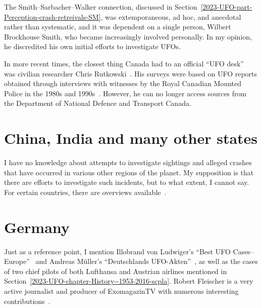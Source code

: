 The Smith--Sarbacher--Walker connection, discussed in Section~\ref{2023-UFO-part-Perception-crash-retreivals-SM}, was extemporaneous, ad hoc, and anecdotal rather than systematic, and it was dependent on a single person, Wilbert Brockhouse Smith, who became increasingly involved personally. In my opinion, he discredited his own initial efforts to investigate UFOs.

In more recent times, the closest thing Canada had to an official ``UFO desk''~\cite{Otis2022Mar} was civilian researcher Chris Rutkowski~\cite{Rutkowski2022May}. His surveys were based on UFO reports obtained through interviews with witnesses by the Royal Canadian Mounted Police in the 1980s and 1990s~\cite{Rutkowsky2022Aug}. However, he can no longer access sources from the Department of National Defence and Transport Canada.



\section{China, India and many other states}
\label{2023-UFO-part-Perception-types-China}

I have no knowledge about attempts to investigate sightings and alleged crashes that have occurred in various other regions of the planet. My supposition is that there are efforts to investigate such incidents, but to what extent, I cannot say. For certain countries, there are overviews available~\cite{Swords2012Jul}.



\section{Germany}
\label{2023-UFO-part-Perception-types-Germany}

Just as a reference point, I mention
Illobrand von Ludwiger's ``Best {UFO} Cases--{E}urope''~\cite{VonLudwigerNIDS}
and
Andreas  M\"uller's ``{D}eutschlands {UFO}-Akten''~\cite{Muller2021Nov},
as well as the cases of two chief pilots of both Lufthansa and Austrian airlines mentioned in Section~\ref{2023-UFO-chapter-History--1953-2016-scpla}.
Robert Fleischer is a very active journalist and producer of ExomagazinTV with numerous interesting contributions~\cite{ExoMagazinTV2022Oct}.
